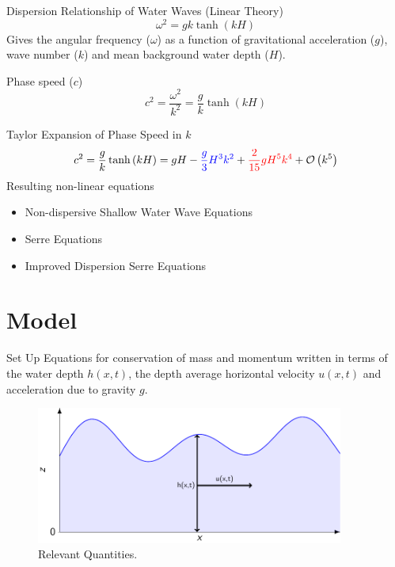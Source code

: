 \documentclass[pdf]{beamer}
\begin{document}
\begin{frame}{Dispersion Relationship of Water Waves (Linear Theory)}
\[\omega^2 = g k \tanh\left(kH\right) \]
Gives the angular frequency ($\omega$) as a function of gravitational acceleration ($g$), wave number ($k$) and mean background water depth ($H$). 

\bigskip
Phase speed ($c$)
\[c^2 = \frac{\omega^2}{k^2} = \frac{g}{k} \tanh\left(kH\right) \]
\end{frame}

\begin{frame}{Taylor Expansion of Phase Speed in $k$}
\[c^2  = \frac{g}{k} \tanh\left(kH\right) = gH - {\color{blue}\frac{g}{3} H^3 k^2} + {\color{red}\frac{2}{15} g H^5 k^4} + \mathcal{O}\left(k^5\right) \]
\pause
Resulting non-linear equations
\begin{itemize}
	\item Non-dispersive Shallow Water Wave Equations
	\item \color{blue} Serre Equations
	\item \color{red} Improved Dispersion Serre Equations
\end{itemize}
\end{frame}


\section{Model}
\begin{frame}{Set Up}
Equations for conservation of mass and momentum written in terms of the water depth $h(x,t)$, the depth average horizontal velocity $u(x,t)$ and acceleration due to gravity $g$.
\begin{figure}
	\centering
	\includegraphics[width=0.9\textwidth]{./Pics/Tex/Explanatory/Setupplot/Waves.pdf}
	\caption{Relevant Quantities.}
\end{figure}
\end{frame}
\end{document}
